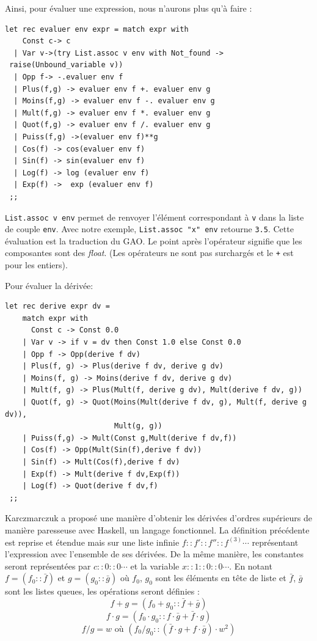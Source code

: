 Ainsi, pour \'evaluer une expression, nous n'aurons plus qu'\`a faire :

\begin{verbatim}
let rec evaluer env expr = match expr with
    Const c-> c 
  | Var v->(try List.assoc v env with Not_found ->
 raise(Unbound_variable v))
  | Opp f-> -.evaluer env f
  | Plus(f,g) -> evaluer env f +. evaluer env g
  | Moins(f,g) -> evaluer env f -. evaluer env g
  | Mult(f,g) -> evaluer env f *. evaluer env g
  | Quot(f,g) -> evaluer env f /. evaluer env g
  | Puiss(f,g) ->(evaluer env f)**g
  | Cos(f) -> cos(evaluer env f)
  | Sin(f) -> sin(evaluer env f)
  | Log(f) -> log (evaluer env f)
  | Exp(f) ->  exp (evaluer env f)
 ;;
\end{verbatim}
\noindent
{\tt List.assoc v env} permet de renvoyer l'\'el\'ement correspondant \`a {\tt v} dans la liste de couple {\tt env}. Avec notre exemple,
{\tt List.assoc "x" env} retourne {\tt 3.5}. Cette \'evaluation est la traduction du GAO. Le point apr\`es l'op\'erateur signifie que les composantes sont des {\it float}. (Les op\'erateurs
ne sont pas surcharg\'es et le \verb!+! est pour les entiers).


Pour \'evaluer la d\'eriv\'ee: 

{\small
\begin{verbatim}
let rec derive expr dv =
    match expr with
      Const c -> Const 0.0
    | Var v -> if v = dv then Const 1.0 else Const 0.0
    | Opp f -> Opp(derive f dv)
    | Plus(f, g) -> Plus(derive f dv, derive g dv)
    | Moins(f, g) -> Moins(derive f dv, derive g dv)
    | Mult(f, g) -> Plus(Mult(f, derive g dv), Mult(derive f dv, g))
    | Quot(f, g) -> Quot(Moins(Mult(derive f dv, g), Mult(f, derive g dv)),
                         Mult(g, g))
    | Puiss(f,g) -> Mult(Const g,Mult(derive f dv,f))
    | Cos(f) -> Opp(Mult(Sin(f),derive f dv))
    | Sin(f) -> Mult(Cos(f),derive f dv)
    | Exp(f) -> Mult(derive f dv,Exp(f))
    | Log(f) -> Quot(derive f dv,f)
 ;;
\end{verbatim}
}
\noindent
Karczmarczuk a propos\'e une mani\`ere d'obtenir les d\'eriv\'ees d'ordres sup\'erieurs de mani\`ere paresseuse avec Haskell,
un langage fonctionnel. La d\'efinition pr\'ec\'edente est reprise et \'etendue mais sur une liste infinie $f::f'::f''::f^{(3)}\cdots $
repr\'esentant l'expression avec l'ensemble de ses d\'eriv\'ees. 
De la même mani\`ere, les constantes seront repr\'esent\'ees par $c::0::0\cdots$
et la variable $x::1::0::0\cdots$. En notant $f=(f_0::\bar f)$ et $g=(g_0::\bar g)$ o\`u $f_0$, $g_0$ sont
les \'el\'ements en tête de liste et $\bar f$, $\bar g$ sont les listes queues, les op\'erations seront d\'efinies :
$$f+g = (f_0+g_0::\bar f+\bar g)$$
$$f\cdot g = (f_0\cdot g_0::f\cdot \bar g+\bar f\cdot g)$$
$$f/g = w \text{  o\`u  }(f_0/g_0::(\bar f\cdot g+f \cdot\bar g)\cdot w^2)$$


